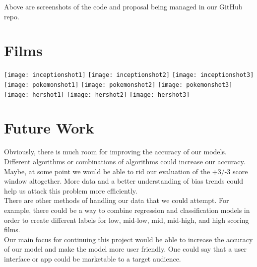 \documentclass[10pt,twocolumn,letterpaper]{article}
\begin{document}
	Above are screenshots of the code and proposal being managed in our GitHub repo.

\section{Films}
	\begin{center}
		\texttt{[image: inceptionshot1]}
		\texttt{[image: inceptionshot2]}
		\texttt{[image: inceptionshot3]}
		\texttt{[image: pokemonshot1]}
		\texttt{[image: pokemonshot2]}
		\texttt{[image: pokemonshot3]}
		\texttt{[image: hershot1]}
		\texttt{[image: hershot2]}
		\texttt{[image: hershot3]}
	\end{center}

\section{Future Work}
	Obviously, there is much room for improving the accuracy of our models. Different
	algorithms or combinations of algorithms could increase our accuracy. Maybe, at some point
	we would be able to rid our evaluation of the +3/-3 score window altogether. More data and
	a better understanding of bias trends could help us attack this problem more efficiently.\\
	There are other methods of handling our data that we could attempt. For example,
	there could be a way to combine regression and classification models in order
	to create different labels for low, mid-low, mid, mid-high, and high scoring
	films.\\
	Our main focus for continuing this project would be able to increase the accuracy of
	our model and make the model more user friendly. One could say that a user interface or
	app could be marketable to a target audience.
	
\end{document}
